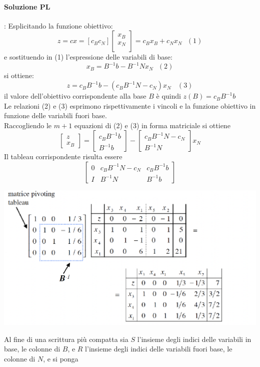 \documentclass[12pt,a4paper]{article}
\begin{document}
 \paragraph{Soluzione PL}: Esplicitando la funzione obiettivo:
 $$z=cx=[c_Bc_N]\left[\begin{array}{c}x_B\\x_N\\\end{array}\right]=c_Bx_B+c_Nx_N \ \ \ (1)$$
e sostituendo in (1) l'espressione delle variabili di base:
$$x_B=B^{-1}b-B^{-1}Nx_N \ \ \ (2)$$
si ottiene: $$z=c_BB^{-1}b - (c_BB^{-1}N-c_N)x_N \ \ \ \ (3)$$
il valore dell'obiettivo corrispondente alla base $B$ è quindi $z(B)=c_BB^{-1}b$\\
Le relazioni (2) e (3) esprimono rispettivamente i vincoli e la funzione obiettivo in funzione delle variabili fuori base.\\
Raccogliendo le $m+1$ equazioni di (2) e (3) in forma matriciale si ottiene
$$\left[\begin{array}{c}z\\x_B\end{array}\right]=\left[\begin{array}{c}c_BB^{-1}b\\B^{-1}b\end{array}\right] - \left[\begin{array}{c}c_BB^{-1}N-c_N\\B^{-1}N\end{array}\right]x_N$$
Il tableau corrispondente risulta essere
$$\left[\begin{array}{ccc}0 & c_BB^{-1}N-c_N &  c_BB^{-1}b \\ I & B^{-1}N & B^{-1}b\end{array}\right]$$
\begin{center}
\includegraphics[width=0.5\columnwidth]{img/soles_tableau.png}
\end{center} 
Al fine di una scrittura più compatta sia $S$ l’insieme degli indici delle variabili in base, le colonne di $B$, e $R$ l’insieme degli indici delle variabili fuori base, le colonne di $N$, e si ponga
\end{document}
